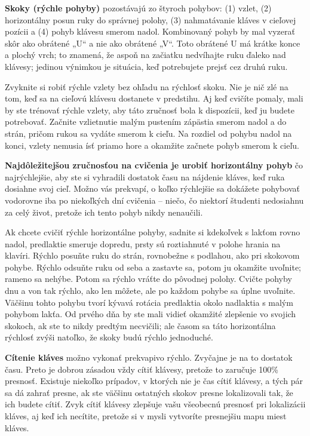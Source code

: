 \documentclass[11pt,a4paper]{book}
\begin{document}
\textbf{Skoky (rýchle pohyby)} pozostávajú zo štyroch pohybov: (1) vzlet, (2) horizontálny posun ruky do správnej polohy, (3) nahmatávanie kláves v cieľovej pozícii a (4) pohyb klávesu smerom nadol. Kombinovaný pohyb by mal vyzerať skôr ako obrátené „U“ a nie ako obrátené „V“. Toto obrátené U má krátke konce a plochý vrch; to znamená, že aspoň na začiatku nedvíhajte ruku ďaleko nad klávesy; jedinou výnimkou je situácia, keď potrebujete prejsť cez druhú ruku.

Zvyknite si robiť rýchle vzlety bez ohľadu na rýchlosť skoku. Nie je nič zlé na tom, keď sa na cieľovú klávesu dostanete v predstihu. Aj keď cvičíte pomaly, mali by ste trénovať rýchle vzlety, aby táto zručnosť bola k dispozícii, keď ju budete potrebovať. Začnite vzlietnutie malým pustením zápästia smerom nadol a do strán, pričom rukou sa vydáte smerom k cieľu. Na rozdiel od pohybu nadol na konci, vzlety nemusia ísť priamo hore a okamžite začnete pohyb smerom k cieľu.

\textbf{Najdôležitejšou zručnosťou na cvičenia je urobiť horizontálny pohyb} čo najrýchlejšie, aby ste si vyhradili dostatok času na nájdenie kláves, keď ruka dosiahne svoj cieľ. Možno vás prekvapí, o koľko rýchlejšie sa dokážete pohybovať vodorovne iba po niekoľkých dní cvičenia – niečo, čo niektorí študenti nedosiahnu za celý život, pretože ich tento pohyb nikdy nenaučili.

Ak chcete cvičiť rýchle horizontálne pohyby, sadnite si kdekoľvek s lakťom rovno nadol, predlaktie smeruje dopredu, prsty sú roztiahnuté v polohe hrania na klavíri. Rýchlo posuňte ruku do strán, rovnobežne s podlahou, ako pri skokovom pohybe. Rýchlo odsuňte ruku od seba a zastavte sa, potom ju okamžite uvoľnite; rameno sa nehýbe. Potom sa rýchlo vráťte do pôvodnej polohy. Cvičte pohyby dnu a von tak rýchlo, ako len môžete, ale po každom pohybe sa úplne uvoľnite. Väčšinu tohto pohybu tvorí kývavá rotácia predlaktia okolo nadlaktia s malým pohybom lakťa. Od prvého dňa by ste mali vidieť okamžité zlepšenie vo svojich skokoch, ak ste to nikdy predtým necvičili; ale časom sa táto horizontálna rýchlosť zvýši natoľko, že skoky budú rýchlo jednoduché.

\textbf{Cítenie kláves} možno vykonať prekvapivo rýchlo. Zvyčajne je na to dostatok času. Preto je dobrou zásadou vždy cítiť klávesy, pretože to zaručuje 100\% presnosť. Existuje niekoľko prípadov, v ktorých nie je čas cítiť klávesy, a tých pár sa dá zahrať presne, ak ste väčšinu ostatných skokov presne lokalizovali tak, že ich budete cítiť. Zvyk cítiť klávesy zlepšuje vašu všeobecnú presnosť pri lokalizácii kláves, aj keď ich necítite, pretože si v mysli vytvoríte presnejšiu mapu miest kláves.
\end{document}
